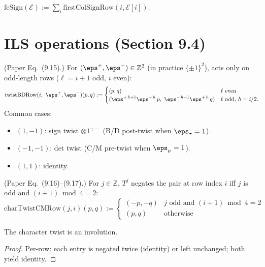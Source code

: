 \begin{definition}
  \label{def:firstColSign}
  \leanok
  $\mathrm{fcSign}(\mathcal{E}) := \sum_i \mathrm{firstColSignRow}(i, \mathcal{E}[i])$.
\end{definition}

\section{ILS operations (Section 9.4)}

\begin{definition}
  \label{def:twistBD}
  \leanok
  (Paper Eq.~(9.15).) For $(\eps^+, \eps^-) \in \mathbb{Z}^2$ (in practice $\{\pm 1\}^2$),
  acts only on odd-length rows ($\ell = i + 1$ odd, $i$ even):
  \[
    \mathrm{twistBDRow}(i,\ \eps^+, \eps^-)(p, q) :=
    \begin{cases}
      (p, q) & \ell\text{ even} \\
      (\eps^{+\,h + 1} \eps^{-\,h}\, p,\ \eps^{-\,h + 1} \eps^{+\,h}\, q) & \ell\text{ odd, } h = i / 2.
    \end{cases}
  \]
  Common cases:
  \begin{itemize}
    \item $(1, -1)$: sign twist $\otimes 1^{+-}$ (B/D post-twist when $\eps_\tau = 1$).
    \item $(-1, -1)$: det twist (C/M pre-twist when $\eps_\wp = 1$).
    \item $(1, 1)$: identity.
  \end{itemize}
\end{definition}

\begin{definition}
  \label{def:charTwistCM}
  \leanok
  (Paper Eq.~(9.16)--(9.17).) For $j \in \mathbb{Z}$, $T^j$ negates the pair at row index $i$ iff $j$ is odd and $(i + 1) \bmod 4 = 2$:
  \[
    \mathrm{charTwistCMRow}(j, i)(p, q) :=
    \begin{cases}
      (-p, -q) & j\text{ odd and } (i + 1) \bmod 4 = 2 \\
      (p, q) & \text{otherwise}
    \end{cases}
  \]
\end{definition}

\begin{lemma}[$T^2 = \mathrm{id}$]
  \label{lem:T_squared}
  \leanok
  The character twist is an involution.
\end{lemma}
\begin{proof}
  \leanok
  Per-row: each entry is negated twice (identity) or left unchanged; both yield identity.
\end{proof}

